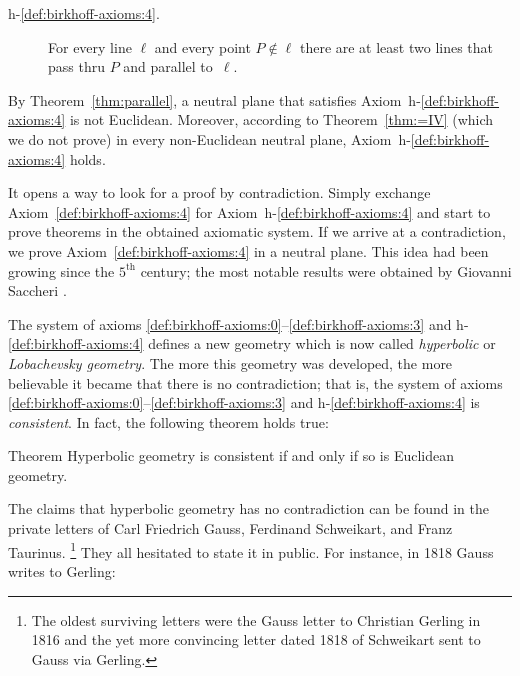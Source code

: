 \begin{framed}
\begin{description}
\item[{\rm h-$\!$\ref{def:birkhoff-axioms:4}.}]\label{def:hyperbolic-4a}  
For every line $\ell$ and every point $P\notin\ell$
there are at least two lines that pass thru $P$ and parallel to~$\ell$.
\end{description}
\end{framed}

By Theorem~\ref{thm:parallel}, a neutral plane that satisfies Axiom~h-$\!$\ref{def:birkhoff-axioms:4} is not Euclidean. 
Moreover, according to Theorem~\ref{thm:=IV} (which we do not prove) 
in every non-Euclidean neutral plane, Axiom~h-$\!$\ref{def:birkhoff-axioms:4} holds.

It opens a way to look for a proof by contradiction.
Simply exchange Axiom~\ref{def:birkhoff-axioms:4} for Axiom~h-$\!$\ref{def:birkhoff-axioms:4}
 and start to prove theorems in the obtained axiomatic system.
If we arrive at a contradiction,
we prove Axiom~\ref{def:birkhoff-axioms:4} in a neutral plane.
This idea had been growing since the $5^\text{th}$ century;
the most notable results were obtained by Giovanni Saccheri \cite{saccheri}.

The system of axioms \ref{def:birkhoff-axioms:0}--\ref{def:birkhoff-axioms:3} and h-$\!$\ref{def:birkhoff-axioms:4} defines a new geometry which is now called \emph{hyperbolic} or \emph{Lobachevsky  geometry}.
The more this geometry was developed,
the more believable it became that there is no contradiction;
that is, the system of axioms \ref{def:birkhoff-axioms:0}--\ref{def:birkhoff-axioms:3} and h-$\!$\ref{def:birkhoff-axioms:4} is \emph{consistent}.
In fact, the following theorem holds true:


\begin{thm}{Theorem}\label{thm:consistent}
Hyperbolic geometry is consistent if and only if so is Euclidean geometry.
\end{thm}

The claims
that hyperbolic geometry has no contradiction can be found in the private letters of
Carl Friedrich Gauss, 
Ferdinand  Schweikart, 
and Franz Taurinus.%
\footnote{The oldest surviving letters were the Gauss letter to Christian Gerling in 1816 
and the yet more convincing letter dated 1818 
of Schweikart sent to Gauss via Gerling.}
They all hesitated to state it in public.
For instance, in 1818 Gauss writes to Gerling:

